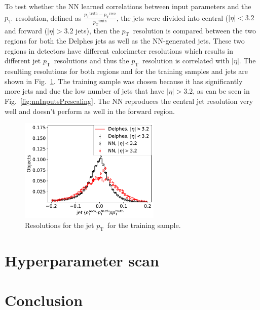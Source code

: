 \documentclass[showpacs,showkeys,preprint,prd,nofootinbib,linenumbers,12pt]{revtex4-1}
\def\pt{\ensuremath{p_{\mathrm{T}}}}
\def\ptRes{\ensuremath{\pt^{\mathrm{truth}}-\pt^{\mathrm{reco}}}}
\begin{document}
To test whether the NN learned correlations between input parameters and the \pt\ resolution, defined as $\frac{\ptRes}{\pt^{\text{truth}}}$, the jets were divided into central ($|\eta|<3.2$ and forward ($|\eta|>3.2$ jets), then the \pt\ resolution is compared between the two regions for both the Delphes jets as well as the NN-generated jets. These two regions in detectors have different calorimeter resolutions which results in different jet \pt\ resolutions and thus the \pt\ resolution is correlated with $|\eta|$. The resulting resolutions for both regions and for the training samples and jets are shown in Fig.~\ref{fig:nnRes}. The training sample was chosen because it has significantly more jets and due the low number of jets that have $|\eta|>3.2$, as can be seen in Fig.~\ref{fig:nnInputsPrescaling}. The NN reproduces the central jet resolution very well and doesn't perform as well in the forward region.

\begin{figure}[htb]
  \includegraphics[width=0.6\textwidth]{jet_pTResEtaPT.pdf}
  \caption{Resolutions for the jet \pt\ for the training sample. }
  \label{fig:nnRes}
\end{figure}

\section{Hyperparameter scan}


\section{Conclusion}
\end{document}
